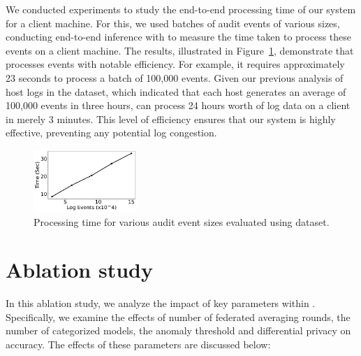  We conducted experiments to study the end-to-end processing time of our system for a client machine. For this, we used batches of audit events of various sizes, conducting end-to-end inference with \Sys to measure the time taken to process these events on a client machine. The results, illustrated in Figure~\ref{sizevstime}, demonstrate that \Sys processes events with notable efficiency. For example, it requires approximately 23 seconds to process a batch of 100,000 events. Given our previous analysis of host logs in the \optc dataset, which indicated that each host generates an average of 100,000 events in three hours, \Sys can process 24 hours worth of log data on a client in merely 3 minutes. This level of efficiency ensures that our system is highly effective, preventing any potential log congestion.

\begin{figure}[!h]
  \centering
  \includegraphics[width=0.35\textwidth]{fig/sizevstime.pdf}
  \caption{Processing time for various audit event sizes evaluated using \optc dataset. }
  \label{sizevstime}
  \vspace{-2ex}
 \end{figure}



\section{Ablation study}
\label{app:ablation}

In this ablation study, we analyze the impact of key parameters within \Sys. Specifically, we examine the effects of number of federated averaging rounds, the number of \gnnshort categorized models, the anomaly threshold and differential privacy on accuracy. The effects of these parameters are discussed below:


